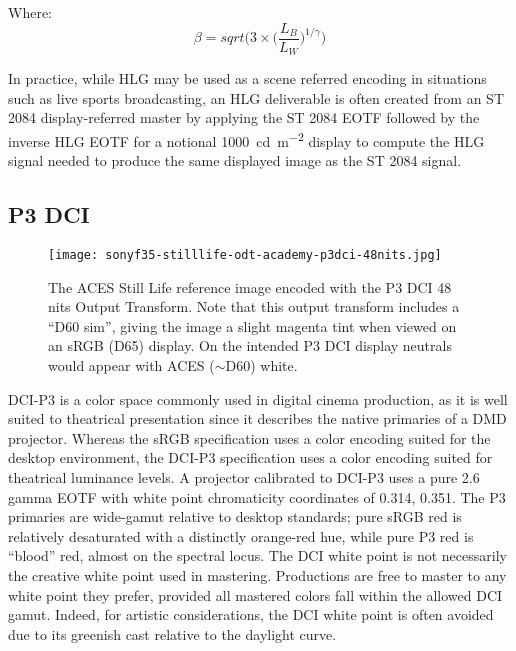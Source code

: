 Where:
\begin{equation}
    \beta = sqrt \big(3 \times \big(\frac{L_B}{L_W}\big)^{1/\gamma}\big)
\end{equation}

\begin{figure}[H]
    \label{fig:hlg-eotf}
\end{figure}

In practice, while HLG may be used as a scene referred encoding in situations such as live sports broadcasting, an HLG deliverable is often created from an ST 2084 display-referred master by applying the ST 2084 EOTF followed by the inverse HLG EOTF for a notional \SI{1000}{\candela\per\metre\squared} display to compute the HLG signal needed to produce the same displayed image as the ST 2084 signal.

\subsection{P3 DCI}%
\label{subsec:p3-dci}

\begin{figure}[H]
    \texttt{[image: sonyf35-stilllife-odt-academy-p3dci-48nits.jpg]}
    \caption{
        The ACES Still Life reference image encoded with the P3 DCI 48 nits Output Transform.\newline
        Note that this output transform includes a ``D60 sim'', giving the image a slight magenta tint when viewed on an sRGB (D65) display.
On the intended P3 DCI display neutrals would appear with ACES ($\sim$D60) white.\newline
        \ccCopyrightAmpas
    }%
    \label{fig:odt-academy-p3dci-48nits}
\end{figure}

DCI-P3 is a color space commonly used in digital cinema production, as it is well suited to theatrical presentation since it describes the native primaries of a DMD projector.
Whereas the sRGB specification uses a color encoding suited for the desktop environment, the DCI-P3 specification uses a color encoding suited for theatrical luminance levels.
\ccPar{}
A projector calibrated to DCI-P3 uses a pure 2.6 gamma EOTF with white point chromaticity coordinates of 0.314, 0.351.
The P3 primaries are wide-gamut relative to desktop standards; pure sRGB red is relatively desaturated with a distinctly orange-red hue, while pure P3 red is ``blood'' red, almost on the spectral locus.
The DCI white point is not necessarily the creative white point used in mastering.
Productions are free to master to any white point they prefer, provided all mastered colors fall within the allowed DCI gamut.
Indeed, for artistic considerations, the DCI white point is often avoided due to its greenish cast relative to the daylight curve.

